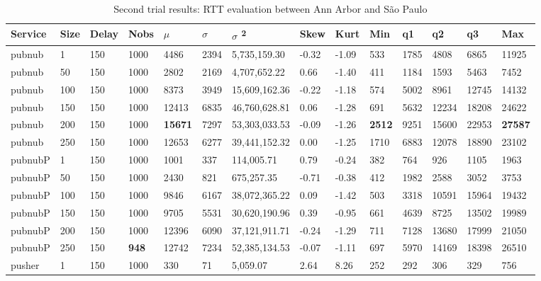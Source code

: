 \begin{table}[!htb]
\footnotesize
\centering
\caption{Second trial results: RTT evaluation between Ann Arbor and São Paulo}
\label{tab:secondtrialarbsao}
\begin{tabular}{llllllllllllll}
Service    & Size & Delay & Nobs & $\mu$ & $\sigma$  & $\sigma$ \textsuperscript{2} & Skew & Kurt & Min & q1   & q2   & q3   & Max   \\ \midrule
pubnub     & 1            & 150   & 1000 & 4486  & 2394 & 5,735,159.30  & -0.32    & -1.09    & 533  & 1785 & 4808  & 6865  & 11925 \\
pubnub     & 50           & 150   & 1000 & 2802  & 2169 & 4,707,652.22  & 0.66     & -1.40    & 411  & 1184 & 1593  & 5463  & 7452  \\
pubnub     & 100          & 150   & 1000 & 8373  & 3949 & 15,609,162.36 & -0.22    & -1.18    & 574  & 5002 & 8961  & 12745 & 14132 \\
pubnub     & 150          & 150   & 1000 & 12413 & 6835 & 46,760,628.81 & 0.06     & -1.28    & 691  & 5632 & 12234 & 18208 & 24622 \\
pubnub     & 200          & 150   & 1000 & \textbf{15671} & 7297 & 53,303,033.53 & -0.09    & -1.26    & \textbf{2512} & 9251 & 15600 & 22953 & \textbf{27587} \\
pubnub     & 250          & 150   & 1000 & 12653 & 6277 & 39,441,152.32 & 0.00     & -1.25    & 1710 & 6883 & 12078 & 18890 & 23102 \\ \hline
pubnubP & 1            & 150   & 1000 & 1001  & 337  & 114,005.71    & 0.79     & -0.24    & 382  & 764  & 926   & 1105  & 1963  \\
pubnubP & 50           & 150   & 1000 & 2430  & 821  & 675,257.35    & -0.71    & -0.38    & 412  & 1982 & 2588  & 3052  & 3753  \\
pubnubP & 100          & 150   & 1000 & 9846  & 6167 & 38,072,365.22 & 0.09     & -1.42    & 503  & 3318 & 10591 & 15964 & 19432 \\
pubnubP & 150          & 150   & 1000 & 9705  & 5531 & 30,620,190.96 & 0.39     & -0.95    & 661  & 4639 & 8725  & 13502 & 19989 \\
pubnubP & 200          & 150   & 1000 & 12396 & 6090 & 37,121,911.71 & -0.24    & -1.29    & 711  & 7128 & 13680 & 17999 & 21050 \\
pubnubP & 250          & 150   & \textbf{948}  & 12742 & 7234 & 52,385,134.53 & -0.07    & -1.11    & 697  & 5970 & 14169 & 18398 & 26510 \\ \hline
pusher     & 1            & 150   & 1000 & 330   & 71   & 5,059.07      & 2.64     & 8.26     & 252  & 292  & 306   & 329   & 756   \\

\end{tabular}
\end{table}
